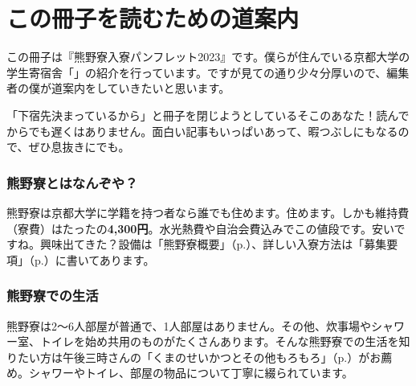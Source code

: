 \setcounter{\thechapter}{-1}
\chapter{この冊子を読むための道案内}

この冊子は『熊野寮入寮パンフレット2023』です。僕らが住んでいる京都大学の学生寄宿舎「」の紹介を行っています。ですが見ての通り少々分厚いので、編集者の僕が道案内をしていきたいと思います。

「下宿先決まっているから」と冊子を閉じようとしているそこのあなた！読んでからでも遅くはありません。面白い記事もいっぱいあって、暇つぶしにもなるので、ぜひ息抜きにでも。

\subsection{熊野寮とはなんぞや？}
熊野寮は京都大学に学籍を持つ者なら誰でも住めます。住めます。しかも維持費（寮費）はたったの\textbf{4,300円}。水光熱費や自治会費込みでこの値段です。安いですね。興味出てきた？設備は「熊野寮概要」（p.\pageref{sec:abst}）、詳しい入寮方法は「募集要項」（p.\pageref{admission}）に書いてあります。

\subsection{熊野寮での生活}
熊野寮は2〜6人部屋が普通で、1人部屋はありません。その他、炊事場やシャワー室、トイレを始め共用のものがたくさんあります。そんな熊野寮での生活を知りたい方は午後三時さんの「くまのせいかつとその他もろもろ」（p.\pageref{sec:kumanoseikatu}）がお薦め。シャワーやトイレ、部屋の物品について丁寧に綴られています。